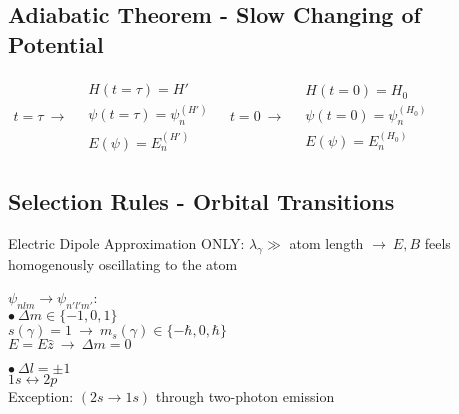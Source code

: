 \documentclass[12pt]{article}
\begin{document}
\subsection{Adiabatic Theorem - Slow Changing of Potential}

\vspace{15pt} 
\hspace{.5cm} \(\begin{aligned}
    t = \tau   \ \rightarrow \ \begin{aligned}
        &H{\scriptstyle(t=\tau)}    = H'\\[5pt]
        &\psi{\scriptstyle(t=\tau)} = \psi_n^{(H')}\\[5pt]
        &E(\psi)                    = E_n^{(H')}
    \end{aligned}
\end{aligned}\)
\hspace{20pt}
\(\begin{aligned}
    t = 0      \ \rightarrow \ \begin{aligned}
        &H{\scriptstyle(t=0)}       = H_0\\[5pt]
        &\psi{\scriptstyle(t=0)}    = \psi_n^{(H_0)}\\[5pt]
        &E(\psi)                    = E_n^{(H_0)}
    \end{aligned}
\end{aligned}\)

\subsection{Selection Rules - Orbital Transitions}

\noindent
Electric Dipole Approximation ONLY: \(\lambda_\gamma \gg\) atom length \(\rightarrow \ E, B\) feels homogenously oscillating to the atom

\vspace{10pt}\noindent
\(\psi_{nlm} \rightarrow \psi_{n'l'm'}\):\\

\noindent
\(\bullet \ \Delta m \in \{ -1,0,1 \}\)\\
\indent \(s(\gamma) = 1 \ \rightarrow \ m_s(\gamma) \in \{ -\hbar, 0, \hbar \}\)\\
\indent \(E = E\hat{z} \ \rightarrow \ \Delta m = 0\) 

\vspace{10pt}\noindent
\(\bullet \ \Delta l = \pm 1\)\\
\indent \(1s \leftrightarrow 2p\)\\
\indent Exception: \((2s \rightarrow 1s)\) through two-photon emission
\end{document}
